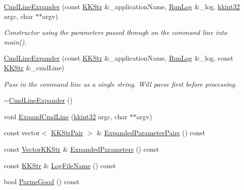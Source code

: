 \begin{DoxyCompactItemize}
\item 
\hyperlink{class_k_k_b_1_1_cmd_line_expander_acb08c0494be7756bbccb94200bfe0059}{Cmd\+Line\+Expander} (const \hyperlink{class_k_k_b_1_1_k_k_str}{K\+K\+Str} \&\+\_\+application\+Name, \hyperlink{class_k_k_b_1_1_run_log}{Run\+Log} \&\+\_\+log, \hyperlink{namespace_k_k_b_a8fa4952cc84fda1de4bec1fbdd8d5b1b}{kkint32} argc, char $\ast$$\ast$argv)
\begin{DoxyCompactList}\small\item\em Constructor using the parameters passed through on the command line into main(). \end{DoxyCompactList}\item 
\hyperlink{class_k_k_b_1_1_cmd_line_expander_afac865e84cceab45bb6ee96c898dc74a}{Cmd\+Line\+Expander} (const \hyperlink{class_k_k_b_1_1_k_k_str}{K\+K\+Str} \&\+\_\+application\+Name, \hyperlink{class_k_k_b_1_1_run_log}{Run\+Log} \&\+\_\+log, const \hyperlink{class_k_k_b_1_1_k_k_str}{K\+K\+Str} \&\+\_\+cmd\+Line)
\begin{DoxyCompactList}\small\item\em Pass in the command line as a single string. Will parse first before processing. \end{DoxyCompactList}\item 
\hyperlink{class_k_k_b_1_1_cmd_line_expander_a914438df12d88f36fb483b89fb4bb6d1}{$\sim$\+Cmd\+Line\+Expander} ()
\item 
void \hyperlink{class_k_k_b_1_1_cmd_line_expander_ade91d41c363631bd723faf5a7ad50ef4}{Expand\+Cmd\+Line} (\hyperlink{namespace_k_k_b_a8fa4952cc84fda1de4bec1fbdd8d5b1b}{kkint32} argc, char $\ast$$\ast$argv)
\item 
const vector$<$ \hyperlink{namespace_k_k_b_a19bc771df76ae3c010ce487b355b02b5}{K\+K\+Str\+Pair} $>$ \& \hyperlink{class_k_k_b_1_1_cmd_line_expander_adf34cbb1e5569bb0e490241923e917b7}{Expanded\+Parameter\+Pairs} () const 
\item 
const \hyperlink{class_k_k_b_1_1_vector_k_k_str}{Vector\+K\+K\+Str} \& \hyperlink{class_k_k_b_1_1_cmd_line_expander_a1a374214d41d055b14273060ea5e2416}{Expanded\+Parameters} () const 
\item 
const \hyperlink{class_k_k_b_1_1_k_k_str}{K\+K\+Str} \& \hyperlink{class_k_k_b_1_1_cmd_line_expander_a2b0c21693071ff86927ae2d39ae57c82}{Log\+File\+Name} () const 
\item 
bool \hyperlink{class_k_k_b_1_1_cmd_line_expander_a737872c299fbd4ea8a1e4a7d1c3d5ade}{Parms\+Good} () const 
\end{DoxyCompactItemize}


